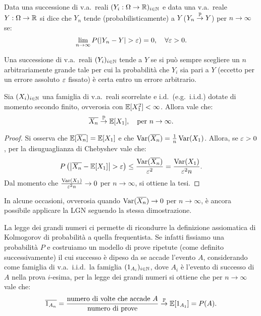 \begin{multicols*}{2}
\begin{definition}
    Data una successione di v.a.~reali $(Y_i : \Omega \to \mathbb{R})_{i \in \mathbb{N}}$ e data
    una v.a.~reale $Y : \Omega \to \mathbb{R}$ si
    dice che $Y_n$ tende (probabilisticamente) a $Y$ ($Y_n \overset{\mathbb{P}}{\to} Y$) per $n \to \infty$
    se:
    \[
        \lim_{n \to \infty} P(\left\lvert Y_n - Y \right\rvert > \varepsilon) = 0, \quad \forall \varepsilon > 0.
    \]
\end{definition}

\begin{remark}
    Una successione di v.a.~reali $(Y_i)_{i \in \mathbb{N}}$ tende a $Y$ se si può
    sempre scegliere un $n$ arbitrariamente grande tale per cui la probabilità che $Y_i$
    sia pari a $Y$ (eccetto per un errore assoluto $\varepsilon$ fissato) è certa entro un
    errore arbitrario.
\end{remark}

\begin{theorem}
    Sia $(X_i)_{i \in \mathbb{N}}$ una famiglia di v.a.~reali scorrelate e i.d.~(e.g.~i.i.d.) dotate di momento secondo
    finito, ovverosia con $\mathbb{E}[X_1^2] < \infty$. Allora vale che:
    \[
        \overline{X_n} \overset{\mathbb{P}}{\to} \mathbb{E}[X_1], \quad \text{per } n \to \infty.
    \]
\end{theorem}

\begin{proof}
    Si osserva che $\mathbb{E}[\overline{X_n}] = \mathbb{E}[X_1]$ e che
    $\operatorname{Var}(\overline{X_n}) = \frac{1}{n} \operatorname{Var}(X_1)$. Allora, se $\varepsilon > 0$,
    per la disuguaglianza di Chebyshev vale che:
    \[
        P\left(\left\lvert \overline{X_n} - \mathbb{E}[X_1] \right\rvert > \varepsilon\right) \leq \frac{\operatorname{Var}(\overline{X_n})}{\varepsilon^2} =
        \frac{\operatorname{Var}(X_1)}{\varepsilon^2 n}.
    \]
    Dal momento che $\frac{\operatorname{Var}(X_1)}{\varepsilon^2 n} \to 0$ per $n \to \infty$, si ottiene
    la tesi.
\end{proof}

\begin{remark}
    In alcune occasioni, ovverosia quando $\operatorname{Var}(\overline{X_n}) \to 0$
    per $n \to \infty$, è ancora possibile applicare la LGN seguendo la stessa
    dimostrazione.
\end{remark}

\begin{remark}
    La legge dei grandi numeri ci permette di ricondurre la definizione
    assiomatica di Kolmogorov di probabilità a quella frequentista. Se
    infatti fissiamo una probabilità $P$ e costruiamo un modello di prove
    ripetute (come definito successivamente) il cui successo è dipeso
    da se accade l'evento $A$, considerando come famiglia di
    v.a.~i.i.d.~la famiglia $(1_{A_i})_{i \in \mathbb{N}}$, dove $A_i$ è l'evento di successo di $A$ nella prova
    $i$-esima, per la legge dei grandi numeri si ottiene che per $n \to \infty$ vale che:
    \[
        \overline{1_{A_n}} = \frac{\text{numero di volte che accade $A$}}{\text{numero di prove}} \overset{\mathbb{P}}{\to} \mathbb{E}[1_{A_1}] = P(A).
    \]
\end{remark}


\end{multicols*}
